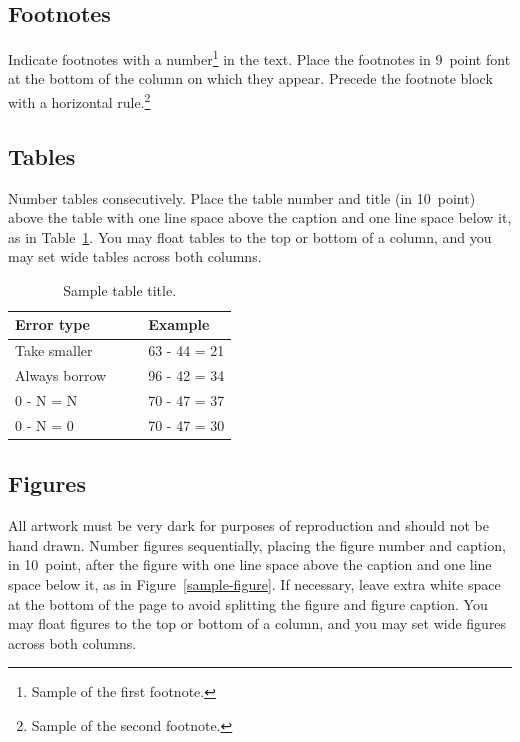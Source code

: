 \documentclass[10pt,letterpaper]{article}
\begin{document}
\subsection{Footnotes}

Indicate footnotes with a number\footnote{Sample of the first footnote.} in the text. Place the
footnotes in 9~point font at the bottom of the column on which they appear. Precede the footnote
block with a horizontal rule.\footnote{Sample of the second footnote.}

\subsection{Tables}

Number tables consecutively. Place the table number and title (in 10~point) above the table with
one line space above the caption and one line space below it, as in Table~\ref{sample-table}. You
may float tables to the top or bottom of a column, and you may set wide tables across both columns.

\begin{table}[H]
  \begin{center}
    \caption{Sample table title.}
    \label{sample-table}
    \vskip 0.12in
    \begin{tabular}{ll}
      \hline
      Error type        & Example      \\
      \hline
      Take smaller      & 63 - 44 = 21 \\
      Always borrow~~~~ & 96 - 42 = 34 \\
      0 - N = N         & 70 - 47 = 37 \\
      0 - N = 0         & 70 - 47 = 30 \\
      \hline
    \end{tabular}
  \end{center}
\end{table}

\subsection{Figures}

All artwork must be very dark for purposes of reproduction and should not be hand drawn. Number
figures sequentially, placing the figure number and caption, in 10~point, after the figure with one
line space above the caption and one line space below it, as in Figure~\ref{sample-figure}. If
necessary, leave extra white space at the bottom of the page to avoid splitting the figure and
figure caption. You may float figures to the top or bottom of a column, and you may set wide
figures across both columns.
\end{document}
